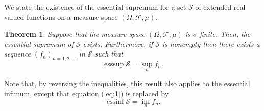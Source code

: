 \documentclass[12pt]{article}
\newtheorem*{theorem*}{Theorem}
\begin{document}
We state the existence of the essential supremum for a set $\mathcal{S}$ of extended real valued functions on a  measure space $(\Omega,\mathcal{F},\mu)$.

\begin{theorem*}
Suppose that the measure space $(\Omega,\mathcal{F},\mu)$ is $\sigma$-finite. Then, the essential supremum of $\mathcal{S}$ exists. Furthermore, if $\mathcal{S}$ is nonempty then there exists a sequence $(f_n)_{n=1,2,\ldots}$ in $\mathcal{S}$ such that
\begin{equation}\label{eq:1}
\operatorname{esssup}\mathcal{S}=\sup_n f_n.
\end{equation}
\end{theorem*}

Note that, by reversing the inequalities, this result also applies to the essential infimum, except that equation (\ref{eq:1}) is replaced by
\begin{equation*}
\operatorname{essinf}\mathcal{S}=\inf_nf_n.
\end{equation*}


\end{document}
